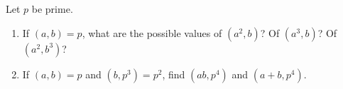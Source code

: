 \documentclass{../ximera}
\begin{document}
\begin{br}
	Let $p$ be prime.
	\begin{enumerate}
		\item If $(a,b)=p$, what are the possible values of $(a^2,b)$? Of $(a^3,b)$? Of $(a^2,b^3)$?
		
			
		\item If $(a,b)=p$ and $(b,p^3)=p^2$, find $(ab,p^4)$ and $(a+b,p^4)$.
		
	\end{enumerate}
\end{br}

\end{document}
